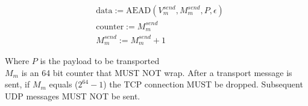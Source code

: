 \begin{align*}
    & \text{data} := \text{AEAD}(V_{m}^{send}, M_{m}^{send}, P, \epsilon)\\
    & \text{counter} := M_{m}^{send}\\
    & M_{m}^{send} := M_{m}^{send} + 1
\end{align*}


Where $P$ is the payload to be transported\\

$M_{m}$ is an 64 bit counter that MUST NOT wrap. After a transport message is sent, if $M_{m}$ equals
($2^{64}-1$) the TCP connection MUST be dropped. Subsequent UDP messages MUST NOT be sent. \\


